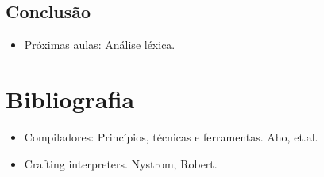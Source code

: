 \documentclass[11pt]{article}
\begin{document}
\subsection*{Conclusão}
\label{sec:orgfcf468b}
\begin{itemize}
\item Próximas aulas: Análise léxica.
\end{itemize}
\section*{Bibliografia}
\label{sec:org910dab1}

\begin{itemize}
\item Compiladores: Princípios, técnicas e ferramentas. Aho, et.al.
\item Crafting interpreters. Nystrom, Robert.
\end{itemize}
\end{document}
